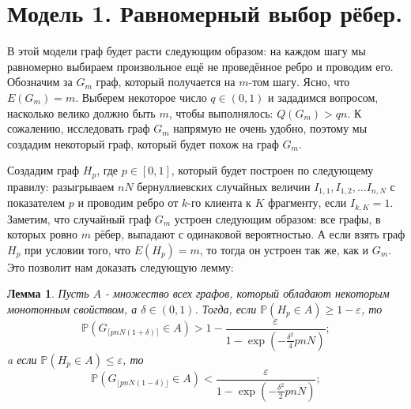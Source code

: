 \documentclass[10pt]{article}
\newcommand{\PRob}{\mathbb P}
\newcommand{\leqs}{\leqslant}
\newcommand{\geqs}{\geqslant}
\newcommand{\eps}{\varepsilon}
\newtheorem{lemma}{Лемма}
\theoremstyle{named}
\begin{document}
\section{Модель 1. Равномерный выбор рёбер.}
В этой модели граф будет расти следующим образом: на каждом шагу мы равномерно выбираем произвольное ещё не проведённое ребро 
и проводим его. Обозначим за $G_m$ граф, который получается на $m$-том шагу. Ясно, что $E(G_m) = m$.
Выберем некоторое число $q \in (0, 1)$ и зададимся вопросом, насколько велико должно быть $m$, чтобы выполнялось: $Q(G_m) > qn$.
К сожалению, исследовать граф $G_m$ напрямую не очень удобно, поэтому мы создадим некоторый граф, который будет похож на граф $G_m$.

Создадим граф $H_p$, где $p \in [0, 1]$, который будет построен по следующему правилу: 
разыгрываем $nN$ бернуллиевских случайных величин $I_{1,1}, I_{1,2}, \dots I_{n,N}$ с показателем $p$ и проводим ребро от $k$-го клиента к $K$ фрагменту, 
если $I_{k, K} = 1$.
Заметим, что случайный граф $G_m$ устроен следующим образом: все графы, в которых ровно $m$ рёбер, выпадают с одинаковой вероятностью.
А если взять граф $H_p$ при условии того, что $E(H_p) = m$, то тогда он устроен так же, как и $G_m$.
Это позволит нам доказать следующую лемму:

\begin{lemma} \label{l1}
Пусть $A$ - множество всех графов, который обладают некоторым монотонным свойством, а $\delta \in (0,1)$.
Тогда, если $\PRob( H_p \in A) \geqs 1 - \eps$, то
\begin{equation} \label{l1_1}
\PRob(G_{\lceil pnN(1+\delta) \rceil} \in A) > 1 - \frac{\eps}{1 - \exp\left(-\frac{\delta^2}{4}pnN\right)};
\end{equation}
a если $\PRob( H_p \in A) \leqs \eps$, то
\begin{equation}\label{l1_2}
\PRob(G_{\lfloor pnN(1-\delta) \rfloor} \in A) < \frac{\eps}{1 - \exp\left(-\frac{\delta^2}{2}pnN\right)};
\end{equation}
\end{lemma}
\end{document}
